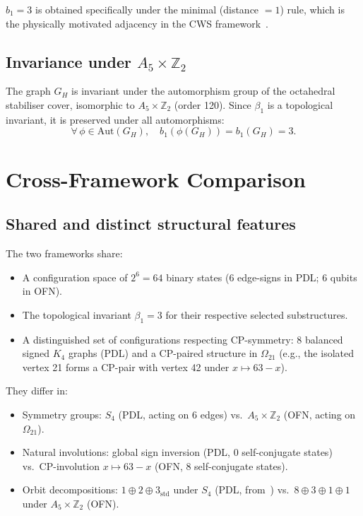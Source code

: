 \documentclass[11pt,a4paper]{article}
\begin{document}
$b_1 = 3$ is obtained specifically under the minimal (distance $= 1$) rule, which is the physically motivated adjacency in the CWS framework~\cite{Evdokimov_CWS_2026}.

\subsection{Invariance under \texorpdfstring{$A_5 \times \mathbb{Z}_2$}{A5 x Z2}}

The graph $G_H$ is invariant under the automorphism group of the octahedral stabiliser cover, isomorphic to $A_5 \times \mathbb{Z}_2$ (order 120). Since $\beta_1$ is a topological invariant, it is preserved under all automorphisms:
\begin{equation}
\forall\, \phi \in \mathrm{Aut}(G_H), \quad b_1(\phi(G_H)) = b_1(G_H) = 3.
\end{equation}

\section{Cross-Framework Comparison}
\label{sec:cross}

\subsection{Shared and distinct structural features}

\begin{result_box}[title={Scripts 2 and 3 --- Orbit and bijection analysis}]
The two frameworks share:
\begin{itemize}
\item A configuration space of $2^6 = 64$ binary states (6 edge-signs in PDL; 6 qubits in OFN).
\item The topological invariant $\beta_1 = 3$ for their respective selected substructures.
\item A distinguished set of configurations respecting CP-symmetry: 8 balanced signed $K_4$
  graphs (PDL) and a CP-paired structure in 
$\Omega_{21}$ (e.g., the isolated vertex 21 forms a CP-pair with vertex 42 under $x \mapsto 63 - x$).
\end{itemize}
They differ in:
\begin{itemize}
\item Symmetry groups: $S_4$ (PDL, acting on 6 edges) vs.\ $A_5 \times \mathbb{Z}_2$ (OFN, acting on $\Omega_{21}$).
\item Natural involutions: global sign inversion (PDL, 0 self-conjugate states) vs.\ CP-involution $x \mapsto 63-x$ (OFN, 8 self-conjugate states).
\item Orbit decompositions: $1 \oplus 2 \oplus 3_{\mathrm{std}}$ under $S_4$ (PDL, from~\cite{Laubscher_D36_2026}) vs.\ $8 \oplus 3 \oplus 1 \oplus 1$ under $A_5 \times \mathbb{Z}_2$ (OFN).
\end{itemize}
\end{result_box}
\end{document}
